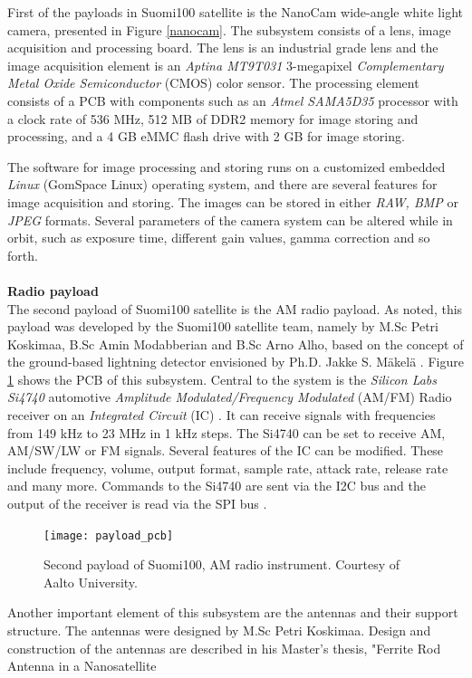 \documentclass[english,12pt,a4paper,pdftex,elec,utf8]{aaltothesis}
\begin{document}
First of the payloads in Suomi100 satellite is the NanoCam wide-angle white light camera, presented in Figure \ref{nanocam}. The subsystem consists of a lens, image acquisition and processing board. The lens is an industrial grade lens and the image acquisition element is an \textit{Aptina MT9T031} 3-megapixel \textit{Complementary Metal Oxide Semiconductor} (CMOS) color sensor. The processing element consists of a PCB with components such as an \textit{Atmel SAMA5D35} processor with a clock rate of 536 MHz, 512 MB of DDR2 memory for image storing and processing, and a 4 GB eMMC flash drive with 2 GB for image storing. \cite{nanocamds}\par
The software for image processing and storing runs on a customized embedded \textit{Linux} (GomSpace Linux) operating system, and there are several features for image acquisition and storing. The images can be stored in either \textit{RAW, BMP} or \textit{JPEG} formats. Several parameters of the camera system can be altered while in orbit, such as exposure time, different gain values, gamma correction and so forth. \cite{nanocamds}
\\
\\ 
\textbf{Radio payload}\\
The second payload of Suomi100 satellite is the AM radio payload. As noted, this payload was developed by the Suomi100 satellite team, namely by M.Sc Petri Koskimaa, B.Sc Amin Modabberian and B.Sc Arno Alho, based on the concept of the ground-based lightning detector envisioned by Ph.D. Jakke S. Mäkelä \cite{jakke1, jakke2, jakke3, jakke4}. Figure \ref{radiopayload} shows the PCB of this subsystem. Central to the system is the \textit{Silicon Labs Si4740} automotive \textit{Amplitude Modulated/Frequency Modulated} (AM/FM) Radio receiver on an \textit{Integrated Circuit} (IC) \cite{siinfo}. It can receive signals with frequencies from 149 kHz to 23 MHz in 1 kHz steps. The Si4740 can be set to receive AM, AM/SW/LW or FM signals. Several features of the IC can be modified. These include frequency, volume, output format, sample rate, attack rate, release rate and many more. 
Commands to the Si4740 are sent via the I2C bus and the output of the receiver is read via the SPI bus \cite{sids}. \par  
\begin{figure}[h!]
\centering
\texttt{[image: payload\_pcb]}
\caption{Second payload of Suomi100, AM radio instrument. Courtesy of Aalto University.}
\label{radiopayload}
\end{figure}
Another important element of this subsystem are the antennas and their support structure. The antennas were designed by M.Sc Petri Koskimaa. Design and construction of the antennas are described in his Master's thesis, "Ferrite Rod Antenna in a Nanosatellite
\end{document}
